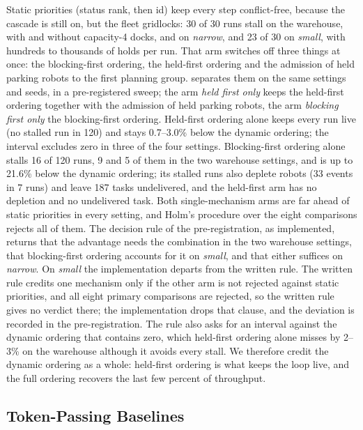 
Static priorities (status rank,
then id) keep every step conflict-free, because the cascade is still on,
but the fleet gridlocks: 30 of 30 runs stall on the warehouse, with and
without capacity-4 docks, and on \emph{narrow}, and 23 of 30 on
\emph{small}, with hundreds to thousands of holds per run. That arm switches off three
things at once: the blocking-first ordering, the held-first ordering and the
admission of held parking robots to the first planning group.
 separates them on the same settings and seeds, in a
pre-registered sweep; the arm \emph{held first only} keeps the held-first ordering
together with the admission of held parking robots, the arm \emph{blocking first only}
the blocking-first ordering. Held-first ordering alone keeps every
run live (no stalled run in 120) and stays 0.7--3.0\% below the dynamic ordering;
the interval excludes zero in three of the four settings. Blocking-first
ordering alone stalls 16 of 120 runs, 9 and 5 of them in the two warehouse
settings, and is up to 21.6\% below the dynamic ordering; its stalled runs also deplete
robots (33 events in 7 runs) and leave 187 tasks undelivered, and the held-first arm has
no depletion and no undelivered task. Both single-mechanism arms are far
ahead of static priorities in every setting, and Holm's procedure over the eight
comparisons rejects all of them. The decision rule of the pre-registration, as
implemented, returns that the advantage needs the combination in the two
warehouse settings, that blocking-first ordering accounts for it on
\emph{small}, and that either suffices on \emph{narrow}. On \emph{small} the
implementation departs from the written rule. The written rule credits one
mechanism only if the other arm is not rejected against static priorities, and
all eight primary comparisons are rejected, so the written rule gives no verdict
there; the implementation drops that clause, and the deviation is recorded in
the pre-registration. The rule also asks for an
interval against the dynamic ordering that contains zero, which held-first
ordering alone misses by 2--3\% on the warehouse although it avoids every stall.
We therefore credit the dynamic ordering as a whole: held-first ordering is
what keeps the loop live, and the full ordering recovers the last few percent
of throughput.

\subsection{Token-Passing Baselines}\label{subsec:baselines}


